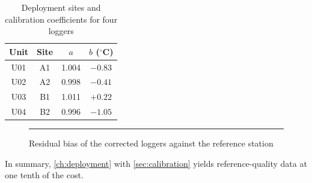 \documentclass[11pt]{report}
\begin{document}
\begin{table}[ht]
  \centering
  \begin{tabular}{|c|c|c|c|}
    \hline
    Unit & Site & $a$ & $b$ ($^{\circ}$C) \\
    \hline
    U01 & A1 & 1.004 & $-0.83$ \\
    U02 & A2 & 0.998 & $-0.41$ \\
    U03 & B1 & 1.011 & $+0.22$ \\
    U04 & B2 & 0.996 & $-1.05$ \\
    \hline
  \end{tabular}
  \caption{Deployment sites and calibration coefficients for four loggers}
  \label{tab:sites}
\end{table}

\begin{figure}[ht]
  \centering
  \rule{0.7\textwidth}{2cm}
  \caption{Residual bias of the corrected loggers against the reference station}
  \label{fig:bias}
\end{figure}

In summary, \autoref{ch:deployment} with \autoref{sec:calibration} yields
reference-quality data at one tenth of the cost.
\end{document}
